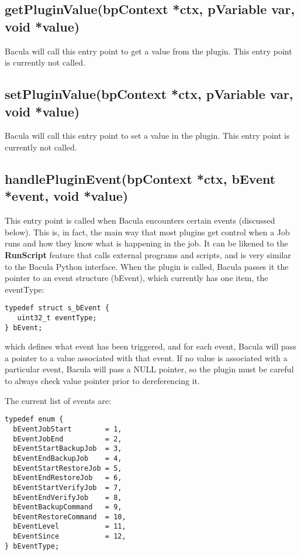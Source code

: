 \subsection{getPluginValue(bpContext *ctx, pVariable var, void *value)} 
Bacula will call this entry point to get
a value from the plugin.  This entry point is currently not called.

\subsection{setPluginValue(bpContext *ctx, pVariable var, void *value)}
Bacula will call this entry point to set
a value in the plugin.  This entry point is currently not called.
 
\subsection{handlePluginEvent(bpContext *ctx, bEvent *event, void *value)}
This entry point is called when Bacula
encounters certain events (discussed below). This is, in fact, the 
main way that most plugins get control when a Job runs and how
they know what is happening in the job. It can be likened to the
{\bf RunScript} feature that calls external programs and scripts,
and is very similar to the Bacula Python interface.
When the plugin is called, Bacula passes it the pointer to an event
structure (bEvent), which currently has one item, the eventType:

\begin{verbatim}
typedef struct s_bEvent {
   uint32_t eventType;
} bEvent;
\end{verbatim}

  which defines what event has been triggered, and for each event,
  Bacula will pass a pointer to a value associated with that event.
  If no value is associated with a particular event, Bacula will 
  pass a NULL pointer, so the plugin must be careful to always check
  value pointer prior to dereferencing it.
  
  The current list of events are:

\begin{verbatim}
typedef enum {
  bEventJobStart        = 1,
  bEventJobEnd          = 2,
  bEventStartBackupJob  = 3,
  bEventEndBackupJob    = 4,
  bEventStartRestoreJob = 5,
  bEventEndRestoreJob   = 6,
  bEventStartVerifyJob  = 7,
  bEventEndVerifyJob    = 8,
  bEventBackupCommand   = 9,
  bEventRestoreCommand  = 10,
  bEventLevel           = 11,
  bEventSince           = 12,
} bEventType;

\end{verbatim}
 
